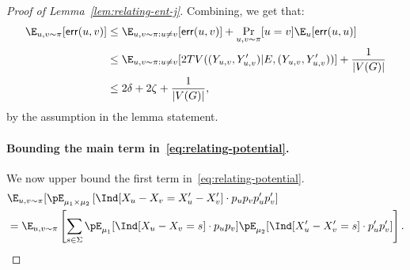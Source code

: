 \begin{proof}[Proof of Lemma~\ref{lem:relating-ent-j}]
Combining, we get that: 
\begin{align}\label{eq:err-uv}
\E_{u,v \sim \pi}[{\sf err}(u,v)] &\leq \E_{u,v \sim \pi: u \neq v}[{\sf err}(u,v)] + \Pr_{u, v \sim \pi}[u = v]\E_{u}[{\sf err}(u,u)] \notag\\
&\leq \E_{u,v \sim \pi: u \neq v}[2 TV((Y_{u,v},Y'_{u,v})|E , (Y_{u,v},Y'_{u,v}))] + \frac{1}{|V(G)|} \notag\\
&\leq 2\delta + 2\zeta + \frac{1}{|V(G)|},
\end{align}
by the assumption in the lemma statement. 
\paragraph{Bounding the main term in~\eqref{eq:relating-potential}.} We now upper bound the first term in~\eqref{eq:relating-potential}. 
\begin{align*}
&\E_{u,v\sim \pi}[\pE_{\mu_1 \times \mu_{2}}\left[ \Ind[X_u - X_v = X'_u- X'_v]\cdot p_u p_vp'_up'_v\right] \\
&=\E_{u,v\sim \pi}\left[\sum_{s \in \Sigma} \pE_{\mu_1}[\Ind[X_u - X_v = s]\cdot p_u p_v]\pE_{\mu_2}[\Ind[X'_u - X'_v = s]\cdot p'_u p'_v]\right].
\end{align*}


\end{proof}
